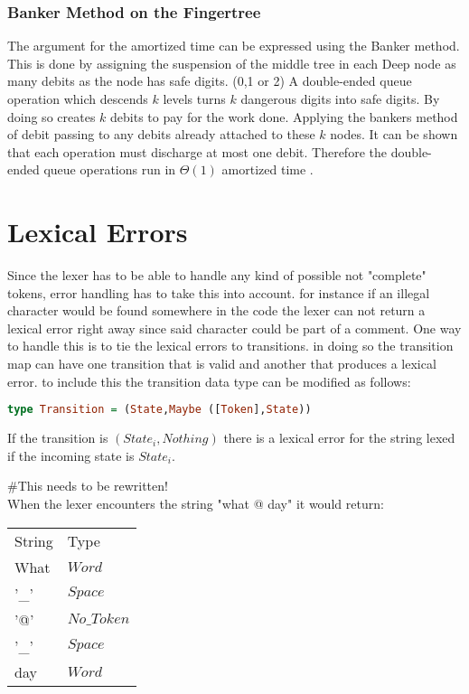 \subsubsection{Banker Method on the Fingertree}
The argument for the amortized time can be expressed using the Banker method.
This is done by assigning the suspension of the middle tree in each Deep node
as many debits as the node has safe digits. (0,1 or 2) A double-ended queue
operation which descends $k$ levels turns $k$ dangerous digits into safe digits.
By doing so creates $k$ debits to pay for the work done.
Applying the bankers method of debit passing to any debits already attached to
these $k$ nodes. It can be shown that each operation must discharge at most
one debit. Therefore the double-ended queue operations run in $\Theta(1)$
amortized time \cite{fingertree}.

\section{Lexical Errors}
Since the lexer has to be able to handle any kind of possible not "complete"
tokens, error handling has to take this into account. for instance if an illegal
character would be found somewhere in the code the lexer can not return a lexical
error right away since said character could be part of a comment. One way to
handle this is to tie the lexical errors to transitions. in doing so the
transition map can have one transition that is valid and another that produces a
lexical error. to include this the transition data type can be modified as
follows:
\begin{lstlisting}[language=Haskell]
type Transition = (State,Maybe ([Token],State))
\end{lstlisting}
If the transition is $(State_i,Nothing)$ there is a lexical error for the string
lexed if the incoming state is $State_i$.


\begin{example}
\#This needs to be rewritten!\\
 When the lexer encounters the
string "what @ day" it would return:
\begin{center}
\begin{tabular}{ll}
String & Type\\
What & $Word$\\
'\_' & $Space$\\
'@' & $No\_Token$\\
'\_' & $Space$\\
day & $Word$\\
\end{tabular}
\end{center}
\end{example}
